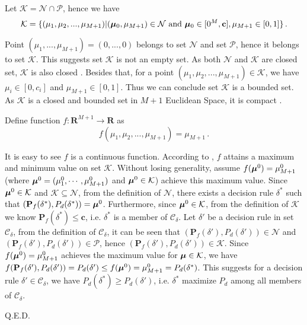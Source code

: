 Let $\mathcal{K} = \mathcal{N} \cap \mathcal{P}$, hence we have
\begin{equation}
\label{apr14a0}
\mathcal{K} = \{
(\mu_1, \mu_2, ..., \mu_{M+1}) | (\boldsymbol{\mu}_0, \mu_{M+1}) \in \mathcal{N} \text{ and } \boldsymbol{\mu}_0 \in [0^M, \mathbf{c}], \mu_{M+1} \in [0, 1]
\}\,.
\end{equation}

Point $(\mu_1, ..., \mu_{M+1}) = (0, ..., 0)$ belongs to set $\mathcal{N}$ and set $\mathcal{P}$, hence it belongs to set $\mathcal{K}$. This suggests set $\mathcal{K}$ is not an empty set.
As both $\mathcal{N}$ and $\mathcal{K}$ are closed set, $\mathcal{K}$ is also closed \cite{rudin1964principles}. Besides that, for a point  $(\mu_1, \mu_2, ..., \mu_{M+1}) \in \mathcal{K}$, we have $\mu_i \in [0, c_i]$ and $\mu_{M+1} \in [0,1]$. Thus we can conclude set $\mathcal{K}$ is a bounded set. As $\mathcal{K}$ is a closed and bounded set in $M+1$ Euclidean Space, it is compact \cite{johnsonbaugh2012foundations}. 

Define function $f: \mathbf{R}^{M+1} \rightarrow \mathbf{R}$ as
\begin{equation}
f(\mu_1, \mu_2, ..., \mu_{M+1}) = \mu_{M+1}\,.
\end{equation}

It is easy to see $f$ is a continuous function. According to \cite{johnsonbaugh2012foundations}, $f$ attains a maximum and minimum value on set $\mathcal{K}$. 
Without losing generality, assume $f(\boldsymbol{\mu}^0)  = \mu_{M+1}^0$ (where $\boldsymbol{\mu}^0 = (\mu_1^0, \cdots, \mu_{M+1}^0)$ and $\boldsymbol{\mu}^0 \in \mathcal{K}$) achieve this maximum value. 
Since $\boldsymbol{\mu}^0 \in \mathcal{K}$ and $\mathcal{K}  \subseteq  \mathcal{N}$, from the definition of $\mathcal{N}$, there exists a decision rule $\delta^\ast$ such that $(\mathbf{P}_{f}(\delta^\ast), P_d(\delta^\ast)) = \boldsymbol{\mu}^0$.  
Furthermore, since $\boldsymbol{\mu}^0 \in \mathcal{K} $, from the definition of $\mathcal{K}$ we know $\mathbf{P}_{f}(\delta^\ast) \leq \mathbf{c}$, 
i.e. $\delta^\ast$ is a member of $\mathcal{C}_\delta$. 
Let $\delta' $ be a decision rule in set $\mathcal{C}_\delta$, 
from the definition of $\mathcal{C}_{\delta}$,   
it can be seen that $(\mathbf{P}_f(\delta'), P_d(\delta')) \in \mathcal{N}$ and $(\mathbf{P}_f(\delta'), P_d(\delta')) \in \mathcal{P}$, hence  $(\mathbf{P}_f(\delta'), P_d(\delta')) \in \mathcal{K}$.
Since $f(\boldsymbol{\mu}^0) = \mu_{M+1}^0$ achieves the maximum value for $\boldsymbol{\mu} \in \mathcal{K}$, we have
$f(\mathbf{P}_f(\delta'), P_d(\delta'))  = P_d(\delta') \leq  f(\boldsymbol{\mu}^0) = \mu_{M+1}^0 =  P_d(\delta^\ast)$. 
This suggests for a decision rule $\delta' \in \mathcal{C}_\delta$, we have $P_d(\delta^\ast) \geq P_d(\delta')$, i.e. $\delta^\ast$ maximize $P_d$ among all members of $\mathcal{C}_\delta$.

Q.E.D.
